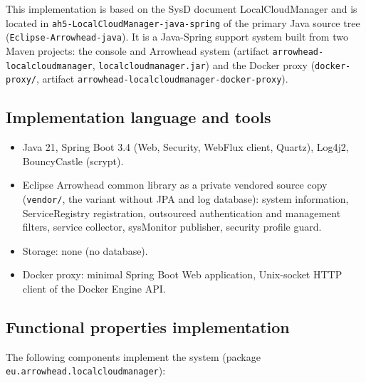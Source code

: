 \documentclass[a4paper]{arrowhead}
\begin{document}
This implementation is based on the SysD document LocalCloudManager \cite{lcm-sysd} and is located in \texttt{ah5-LocalCloudManager-java-spring} of the primary Java source tree (\texttt{Eclipse-Arrowhead-java}). It is a Java-Spring support system built from two Maven projects: the console and Arrowhead system (artifact \texttt{arrowhead-\allowbreak{}localcloudmanager}, \texttt{localcloudmanager.\allowbreak{}jar}) and the Docker proxy (\texttt{docker-\allowbreak{}proxy/}, artifact \texttt{arrowhead-\allowbreak{}localcloudmanager-\allowbreak{}docker-\allowbreak{}proxy}).

\subsection{Implementation language and tools}
\begin{itemize}
\item Java 21, Spring Boot 3.4 (Web, Security, WebFlux client, Quartz), Log4j2, BouncyCastle (scrypt).
\item Eclipse Arrowhead common library as a private vendored source copy (\texttt{vendor/}, the variant without JPA and log database): system information, ServiceRegistry registration, outsourced authentication and management filters, service collector, sysMonitor publisher, security profile guard.
\item Storage: none (no database).
\item Docker proxy: minimal Spring Boot Web application, Unix-socket HTTP client of the Docker Engine API.
\end{itemize}

\subsection{Functional properties implementation}

The following components implement the system (package \texttt{eu.\allowbreak{}arrowhead.\allowbreak{}localcloudmanager}):
\end{document}
